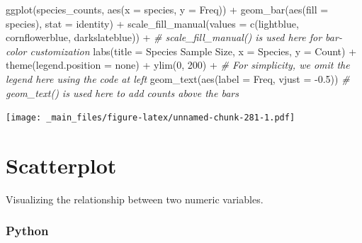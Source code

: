 \documentclass[
]{book}
\newenvironment{Shaded}{\begin{snugshade}}{\end{snugshade}}
\newcommand{\AttributeTok}[1]{\textcolor[rgb]{0.77,0.63,0.00}{#1}}
\newcommand{\CommentTok}[1]{\textcolor[rgb]{0.56,0.35,0.01}{\textit{#1}}}
\newcommand{\DecValTok}[1]{\textcolor[rgb]{0.00,0.00,0.81}{#1}}
\newcommand{\FloatTok}[1]{\textcolor[rgb]{0.00,0.00,0.81}{#1}}
\newcommand{\FunctionTok}[1]{\textcolor[rgb]{0.00,0.00,0.00}{#1}}
\newcommand{\NormalTok}[1]{#1}
\newcommand{\SpecialCharTok}[1]{\textcolor[rgb]{0.00,0.00,0.00}{#1}}
\newcommand{\StringTok}[1]{\textcolor[rgb]{0.31,0.60,0.02}{#1}}
\begin{document}
\begin{Shaded}
\begin{Highlighting}[]
\FunctionTok{ggplot}\NormalTok{(species\_counts, }\FunctionTok{aes}\NormalTok{(}\AttributeTok{x =}\NormalTok{ species, }\AttributeTok{y =}\NormalTok{ Freq)) }\SpecialCharTok{+}
  \FunctionTok{geom\_bar}\NormalTok{(}\FunctionTok{aes}\NormalTok{(}\AttributeTok{fill =}\NormalTok{ species), }\AttributeTok{stat =} \StringTok{\textquotesingle{}identity\textquotesingle{}}\NormalTok{) }\SpecialCharTok{+}
  \FunctionTok{scale\_fill\_manual}\NormalTok{(}\AttributeTok{values =} \FunctionTok{c}\NormalTok{(}\StringTok{\textquotesingle{}lightblue\textquotesingle{}}\NormalTok{, }\StringTok{\textquotesingle{}cornflowerblue\textquotesingle{}}\NormalTok{, }\StringTok{\textquotesingle{}darkslateblue\textquotesingle{}}\NormalTok{)) }\SpecialCharTok{+} \CommentTok{\# scale\_fill\_manual() is used here for bar{-}color customization}
  \FunctionTok{labs}\NormalTok{(}\AttributeTok{title =} \StringTok{\textquotesingle{}Species Sample Size\textquotesingle{}}\NormalTok{, }\AttributeTok{x =} \StringTok{\textquotesingle{}Species\textquotesingle{}}\NormalTok{, }\AttributeTok{y =} \StringTok{\textquotesingle{}Count\textquotesingle{}}\NormalTok{) }\SpecialCharTok{+}
  \FunctionTok{theme}\NormalTok{(}\AttributeTok{legend.position =} \StringTok{\textquotesingle{}none\textquotesingle{}}\NormalTok{) }\SpecialCharTok{+} \FunctionTok{ylim}\NormalTok{(}\DecValTok{0}\NormalTok{, }\DecValTok{200}\NormalTok{) }\SpecialCharTok{+} \CommentTok{\# For simplicity, we omit the legend here using the code at left}
  \FunctionTok{geom\_text}\NormalTok{(}\FunctionTok{aes}\NormalTok{(}\AttributeTok{label =}\NormalTok{ Freq, }\AttributeTok{vjust =} \SpecialCharTok{{-}}\FloatTok{0.5}\NormalTok{)) }\CommentTok{\# geom\_text() is used here to add counts above the bars}
\end{Highlighting}
\end{Shaded}

\texttt{[image: \_main\_files/figure-latex/unnamed-chunk-281-1.pdf]}

\hypertarget{scatterplot}{%
\section{Scatterplot}\label{scatterplot}}

Visualizing the relationship between two numeric variables.

\hypertarget{python-43}{%
\subsubsection*{Python}\label{python-43}}
\end{document}
